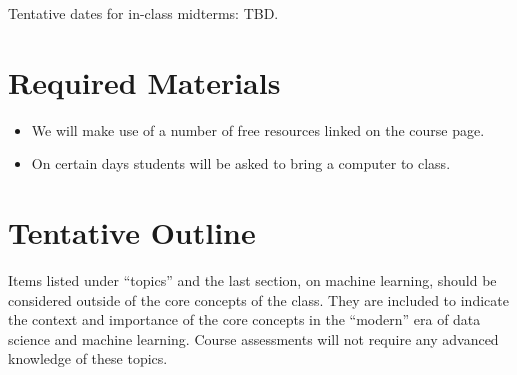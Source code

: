 \documentclass[11pt]{article}
\begin{document}
Tentative dates for in-class midterms: TBD.

\bigskip


\section*{Required Materials}

\begin{itemize}
\item We will make use of a number of free resources linked on the course page.
\item On certain days students will be asked to bring a computer to class. 
\end{itemize}



\section*{Tentative Outline}

Items listed under ``topics'' and the last section, on machine learning, should be considered outside of the core concepts of the class. They are included to indicate the context and importance of the core concepts in the ``modern'' era of data science and machine learning. Course assessments will not require any advanced knowledge of these topics.
\end{document}
